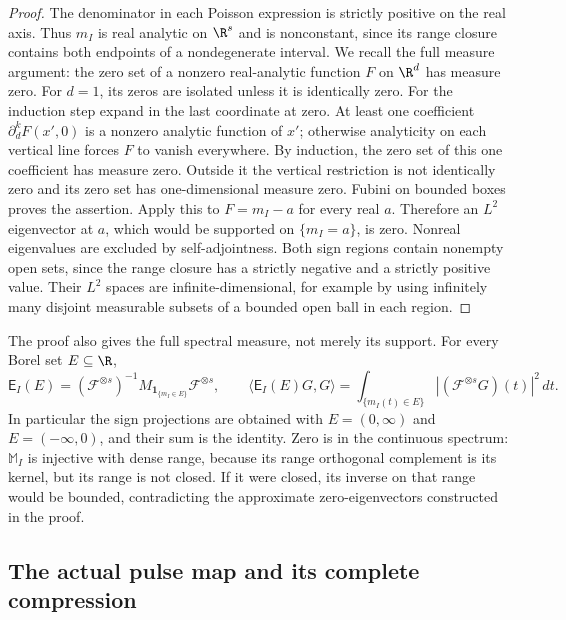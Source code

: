 \documentclass[11pt,a4paper]{article}
\theoremstyle{definition}\newtheorem{definition}[theorem]{Definition}
\begin{document}
\begin{proof}
The denominator in each Poisson expression is strictly positive
on the real axis. Thus $m_I$ is real analytic on $\R^s$ and is
nonconstant, since its range closure contains both endpoints of
a nondegenerate interval. We recall the full measure argument:
the zero set of a nonzero real-analytic function $F$ on $\R^d$
has measure zero. For $d=1$, its zeros are isolated unless it is
identically zero. For the induction step expand in the last
coordinate at zero. At least one coefficient
$\partial_d^kF(x',0)$ is a nonzero analytic function of $x'$;
otherwise analyticity on each vertical line forces $F$ to vanish
everywhere. By induction, the zero set of this one coefficient
has measure zero. Outside it the vertical restriction is not
identically zero and its zero set has one-dimensional measure
zero. Fubini on bounded boxes proves the assertion.
Apply this to $F=m_I-a$ for every real $a$. Therefore an
$L^2$ eigenvector at $a$, which would be supported on
$\{m_I=a\}$, is zero. Nonreal eigenvalues are excluded by
self-adjointness. Both sign regions contain nonempty open sets,
since the range closure has a strictly negative and a strictly
positive value. Their $L^2$ spaces are infinite-dimensional,
for example by using infinitely many disjoint measurable subsets
of a bounded open ball in each region.
\end{proof}

The proof also gives the full spectral measure, not merely its
support. For every Borel set $E\subseteq\R$,
\begin{equation}\tag{FMS17}\label{fms:fms:projection}
 \mathsf E_I(E)=
 (\mathscr F^{\otimes s})^{-1}
       M_{\mathbf1_{\{m_I\in E\}}}\mathscr F^{\otimes s},\qquad
 \langle\mathsf E_I(E)G,G\rangle
 =\int_{\{m_I(t)\in E\}}
            |(\mathscr F^{\otimes s}G)(t)|^2\,dt.
\end{equation}
In particular the sign projections are obtained with
$E=(0,\infty)$ and $E=(-\infty,0)$, and their sum is the identity.
Zero is in the continuous spectrum: $\mathbb M_I$ is injective
with dense range, because its range orthogonal complement is its
kernel, but its range is not closed. If it were closed, its inverse
on that range would be bounded, contradicting the approximate
zero-eigenvectors constructed in the proof.

\subsection{The actual pulse map and its complete compression}
\end{document}
